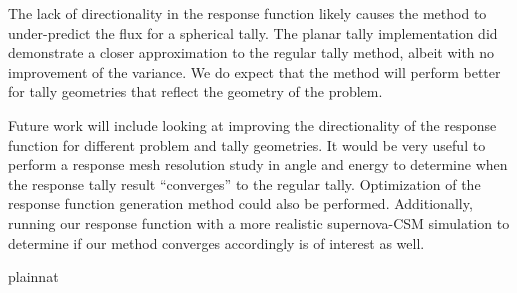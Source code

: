 The lack of directionality in the response function likely causes the method to under-predict the flux for a spherical tally. The planar tally implementation did demonstrate a closer approximation to the regular tally method, albeit with no improvement of the variance. We do expect that the method will perform better for tally geometries that reflect the geometry of the problem.

Future work will include looking at improving the directionality of the response function for different problem and tally geometries. It would be very useful to perform a response mesh resolution study in angle and energy to determine when the response tally result ``converges'' to the regular tally. Optimization of the response function generation method could also be performed. Additionally, running our response function with a more realistic supernova-CSM simulation to determine if our method converges accordingly is of interest as well.

%
{}{}

 {plainnat}



